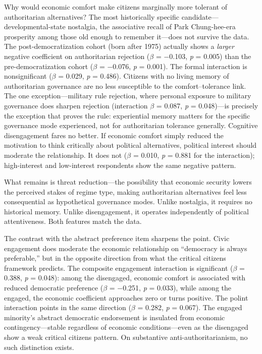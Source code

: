 \documentclass[
  12pt,
  12pt,
  letterpaper]{article}
\begin{document}
Why would economic comfort make citizens marginally more tolerant of
authoritarian alternatives? The most historically specific
candidate---developmental-state nostalgia, the associative recall of
Park Chung-hee-era prosperity among those old enough to remember
it---does not survive the data. The post-democratization cohort (born
after 1975) actually shows a \emph{larger} negative coefficient on
authoritarian rejection (\(\beta\) = −0.103, \emph{p} = 0.005) than the
pre-democratization cohort (\(\beta\) = −0.076, \emph{p} = 0.001). The
formal interaction is nonsignificant (\(\beta\) = 0.029, \emph{p} =
0.486). Citizens with no living memory of authoritarian governance are
no less susceptible to the comfort--tolerance link. The one
exception---military rule rejection, where personal exposure to military
governance does sharpen rejection (interaction \(\beta\) = 0.087,
\emph{p} = 0.048)---is precisely the exception that proves the rule:
experiential memory matters for the specific governance mode
experienced, not for authoritarian tolerance generally. Cognitive
disengagement fares no better. If economic comfort simply reduced the
motivation to think critically about political alternatives, political
interest should moderate the relationship. It does not (\(\beta\) =
0.010, \emph{p} = 0.881 for the interaction); high-interest and
low-interest respondents show the same negative pattern.

What remains is threat reduction---the possibility that economic
security lowers the perceived stakes of regime type, making
authoritarian alternatives feel less consequential as hypothetical
governance modes. Unlike nostalgia, it requires no historical memory.
Unlike disengagement, it operates independently of political
attentiveness. Both features match the data.

The contrast with the abstract preference item sharpens the point. Civic
engagement does moderate the economic relationship on ``democracy is
always preferable,'' but in the opposite direction from what the
critical citizens framework predicts. The composite engagement
interaction is significant (\(\beta\) = 0.388, \emph{p} = 0.048): among
the disengaged, economic comfort is associated with reduced democratic
preference (\(\beta\) = −0.251, \emph{p} = 0.033), while among the
engaged, the economic coefficient approaches zero or turns positive. The
polint interaction points in the same direction (\(\beta\) = 0.282,
\emph{p} = 0.067). The engaged minority's abstract democratic
endorsement is insulated from economic contingency---stable regardless
of economic conditions---even as the disengaged show a weak critical
citizens pattern. On substantive anti-authoritarianism, no such
distinction exists.
\end{document}
